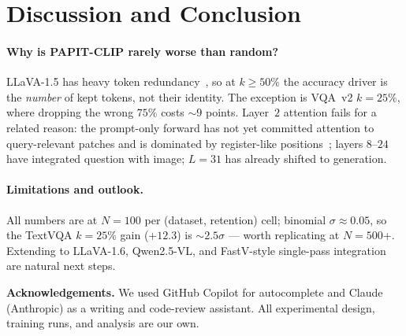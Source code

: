 \documentclass[10pt,twocolumn,letterpaper]{article}
\begin{document}
\section{Discussion and Conclusion}
\label{sec:discussion}

\paragraph{Why is PAPIT-CLIP rarely worse than random?}
LLaVA-1.5 has heavy token redundancy~\cite{chen2024fastv}, so at
$k\!\geq\!50\%$ the accuracy driver is the \emph{number} of kept
tokens, not their identity. The exception is VQA~v2 $k\!=\!25\%$,
where dropping the wrong $75\%$ costs ${\sim}9$ points.
Layer~$2$ attention fails for a related reason: the prompt-only
forward has not yet committed attention to query-relevant patches
and is dominated by register-like positions~\cite{darcet2024registers};
layers $8$--$24$ have integrated question with image; $L\!=\!31$ has
already shifted to generation.

\paragraph{Limitations and outlook.}
All numbers are at $N{=}100$ per (dataset, retention) cell;
binomial $\sigma\!\approx\!0.05$, so the TextVQA $k\!=\!25\%$ gain
($+12.3$) is ${\sim}2.5\sigma$ — worth replicating at $N{=}500$+.
Extending to LLaVA-1.6, Qwen2.5-VL, and FastV-style single-pass
integration are natural next steps.

\noindent\textbf{Acknowledgements.}
We used GitHub Copilot for autocomplete and Claude (Anthropic) as a
writing and code-review assistant. All experimental design, training
runs, and analysis are our own.

{\small


}
\end{document}
